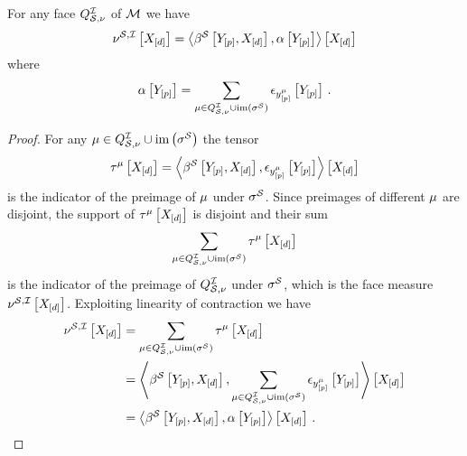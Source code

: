 \begin{theorem}\label{the:faceMeasureCharacterization}
    For any face $Q^{\mathcal{I}}_{\mathcal{S},\nu}$ of $\mathcal{M}$ we have
    \begin{align*}
         \nu^{\mathcal{S},\mathcal{I}}\left[X_{[d]}\right]
         =\left\langle \beta^{\mathcal{S}}\left[Y_{[p]},X_{[d]}\right],\alpha\left[Y_{[p]}\right]\right\rangle \left[ X_{[d]} \right]
    \end{align*}
    where
    \begin{align*}
        \alpha\left[Y_{[p]}\right]
        = \sum_{\mu\in Q^{\mathcal{I}}_{\mathcal{S},\nu}\cup\mathrm{im}\left(\sigma^{\mathcal{S}}\right)} \epsilon_{y^{\mu}_{[p]}}\left[Y_{[p]}\right] \, .
    \end{align*}
\end{theorem}
\begin{proof}
    For any $\mu\in Q^{\mathcal{I}}_{\mathcal{S},\nu}\cup\mathrm{im}\left(\sigma^{\mathcal{S}}\right)$ the tensor
    \begin{align*}
        \tau^{\mu}\left[X_{[d]}\right]
        = \left\langle \beta^{\mathcal{S}}\left[Y_{[p]},X_{[d]}\right],\epsilon_{y^{\mu}_{[p]}}\left[Y_{[p]}\right]\right\rangle \left[ X_{[d]} \right]
    \end{align*}
    is the indicator of the preimage of $\mu$ under $\sigma^{\mathcal{S}}$.
    Since preimages of different $\mu$ are disjoint, the support of $\tau^{\mu}\left[X_{[d]}\right]$ is disjoint and their sum
    \begin{align*}
        \sum_{\mu\in Q^{\mathcal{I}}_{\mathcal{S},\nu}\cup\mathrm{im}\left(\sigma^{\mathcal{S}}\right)} \tau^{\mu}\left[X_{[d]}\right]
    \end{align*}
    is the indicator of the preimage of $Q^{\mathcal{I}}_{\mathcal{S},\nu}$ under $\sigma^{\mathcal{S}}$, which is the face measure $\nu^{\mathcal{S},\mathcal{I}}\left[X_{[d]}\right]$.
    Exploiting linearity of contraction we have
    \begin{align*}
        \nu^{\mathcal{S},\mathcal{I}}\left[X_{[d]}\right]
        &= \sum_{\mu\in Q^{\mathcal{I}}_{\mathcal{S},\nu}\cup\mathrm{im}\left(\sigma^{\mathcal{S}}\right)} \tau^{\mu}\left[X_{[d]}\right] \\
        &= \left\langle \beta^{\mathcal{S}}\left[Y_{[p]},X_{[d]}\right],\sum_{\mu\in Q^{\mathcal{I}}_{\mathcal{S},\nu}\cup\mathrm{im}\left(\sigma^{\mathcal{S}}\right)}\epsilon_{y^{\mu}_{[p]}}\left[Y_{[p]}\right]\right\rangle \left[ X_{[d]} \right] \\
        &= \left\langle \beta^{\mathcal{S}}\left[Y_{[p]},X_{[d]}\right],\alpha\left[Y_{[p]}\right]\right\rangle \left[ X_{[d]} \right] \, .
    \end{align*}
\end{proof}

